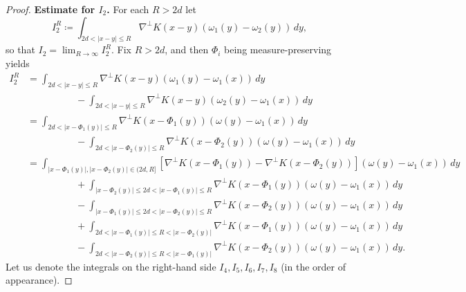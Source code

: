 \documentclass[reqno,centertags,12pt]{amsart}
\theoremstyle{definition}
\numberwithin{equation}{section}
\newcommand{\abs}[1]{\left\lvert#1\right\rvert}
\begin{document}
\begin{proof}
    \textbf{Estimate for $I_{2}$.} For each $R>2d$ let
    \[
        I_{2}^{R}\coloneqq \int_{2d<\abs{x-y}\leq R}
        \nabla^{\perp}K(x-y)(\omega_{1}(y) - \omega_{2}(y))\,dy,
    \]
    so that $I_{2} = \lim_{R\to\infty}I_{2}^{R}$. Fix $R>2d$, and then $\Phi_i$ being measure-preserving yields
    \begin{align*}
        I_{2}^{R} &= \int_{2d< \abs{x - y} \leq R}
        \nabla^{\perp}K(x - y)(\omega_{1}(y) - \omega_{1}(x))\,dy
        \\&\quad\quad\quad\quad\quad
        - \int_{2d < \abs{x - y} \leq R}
        \nabla^{\perp}K(x - y)(\omega_{2}(y) - \omega_{1}(x))\,dy \\
        &= \int_{2d < \abs{x - \Phi_{1}(y)} \leq R}\nabla^{\perp}K(x - \Phi_{1}(y))
        (\omega(y) - \omega_{1}(x))\,dy
        \\&\quad\quad\quad\quad\quad
        - \int_{2d < \abs{x - \Phi_{2}(y)} \leq R}\nabla^{\perp}K(x - \Phi_{2}(y))
        (\omega(y) - \omega_{1}(x))\,dy \\
        &= \int_{\abs{x - \Phi_{1}(y)},\abs{x - \Phi_{2}(y)}\in (2d,R]}
        \left[
            \nabla^{\perp}K(x - \Phi_{1}(y)) - \nabla^{\perp}K(x - \Phi_{2}(y))
        \right]
        (\omega(y) - \omega_{1}(x))\,dy
        \\&\quad\quad\quad\quad\quad
        + \int_{\abs{x - \Phi_{2}(y)} \leq 2d < \abs{x - \Phi_{1}(y)} \leq R}
        \nabla^{\perp}K(x - \Phi_{1}(y))(\omega(y) - \omega_{1}(x))\,dy
        \\&\quad\quad\quad\quad\quad
        - \int_{\abs{x - \Phi_{1}(y)} \leq 2d < \abs{x - \Phi_{2}(y)} \leq R}
        \nabla^{\perp}K(x - \Phi_{2}(y))(\omega(y) - \omega_{1}(x))\,dy
        \\&\quad\quad\quad\quad\quad
        + \int_{2d < \abs{x - \Phi_{1}(y)} \leq R < \abs{x - \Phi_{2}(y)}}
        \nabla^{\perp}K(x - \Phi_{1}(y))(\omega(y) - \omega_{1}(x))\,dy
        \\&\quad\quad\quad\quad\quad
        - \int_{2d < \abs{x - \Phi_{2}(y)} \leq R < \abs{x - \Phi_{1}(y)}}
        \nabla^{\perp}K(x - \Phi_{2}(y))(\omega(y) - \omega_{1}(x))\,dy.
    \end{align*}
    Let us denote the integrals on the right-hand side  $I_{4},I_{5},I_{6},I_{7},I_{8}$
     (in the order of appearance).


\end{proof}
\end{document}
